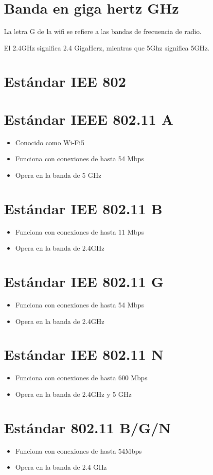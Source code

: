 \documentclass[letterpaper,12pt]{article}
\begin{document}
\begin{sloppypar}
\section{Banda en giga hertz GHz}
La letra G de la wifi se refiere a las bandas de frecuencia de radio.

El 2.4GHz significa 2.4 GigaHerz, mientras que 5Ghz significa 5GHz.
\section*{Estándar IEE 802}
\section{Estándar IEEE 802.11 A}
\begin{itemize}
    \item Conocido como Wi-Fi5
    \item Funciona con conexiones de hasta 54 Mbps 
    \item Opera en la banda de 5 GHz
\end{itemize}
\section{Estándar IEE 802.11 B}
\begin{itemize}
    \item Funciona con conexiones de hasta 11 Mbps
    \item Opera en la banda de 2.4GHz
\end{itemize}
\section{Estándar IEE 802.11 G}
\begin{itemize}
    \item Funciona con conexiones de hasta 54 Mbps 
    \item Opera en la banda de 2.4GHz
\end{itemize}
\section{Estándar IEE 802.11 N}
\begin{itemize}
    \item Funciona con conexiones de hasta 600 Mbps 
    \item Opera en la banda de 2.4GHz y 5 GHz
\end{itemize}
\section{Estándar 802.11 B/G/N}
\begin{itemize}
    \item Funciona con conexiones de hasta 54Mbps 
    \item Opera en la banda de 2.4 GHz
\end{itemize}

\end{sloppypar}
\end{document}
